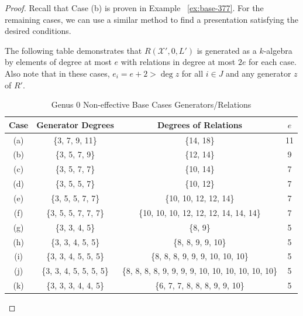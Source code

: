 \documentclass{amsart}
\theoremstyle{plain}
\theoremstyle{definition}
\theoremstyle{remark}
\numberwithin{equation}{section}
\newcommand \sx{\mathscr X}
\begin{document}
\begin{proof}
Recall that Case (b) is proven in Example ~\ref{ex:base-377}. For
the remaining cases, we can use a similar method to find a
presentation satisfying the desired conditions.

The following table demonstrates that $R(\sx', 0, L')$ is
generated as a $k$-algebra by elements of degree at most $e$
with relations in degree at most $2e$ for each case. Also note
that in these cases, $e_i = e + 2 > \deg z$ for all $i \in J$
and any generator $z$ of $R'$.
\begin{longtable}
	{| c || c | c | c |}
	\caption{Genus 0 Non-effective Base Cases Generators/Relations}
	\label{table:g-0-base-cases-degrees}
	
	\tabularnewline
	
	\hline
	Case & Generator Degrees & Degrees of Relations & $e$\\
	\hline
	\hline

	(a) & \{3, 7, 9, 11\} & \{14, 18\} & 11\\	\hline

	(b) & \{3, 5, 7, 9\} & \{12, 14\}	& 9\\ \hline

	(c) & \{3, 5, 7, 7\} & \{10, 14\}	& 7\\ \hline
	
	(d) & \{3, 5, 5, 7\} & \{10, 12\}	& 7\\ \hline
	
	(e) & \{3, 5, 5, 7, 7\} & \{10, 10, 12, 12, 14\}	& 7\\ \hline
	
	(f) & \{3, 5, 5, 7, 7, 7\} & \{10, 10, 10, 12, 12, 12, 14, 14, 14\}	& 7\\ \hline

	(g) & \{3, 3, 4, 5\} & \{8, 9\} & 5\\ \hline
	
	(h) & \{3, 3, 4, 5, 5\} & \{8, 8, 9, 9, 10\} & 5\\ \hline
	
	(i) & \{3, 3, 4, 5, 5, 5\} &
	\{8, 8, 8, 9, 9, 9, 10, 10, 10\} & 5\\ \hline
	
	(j) & \{3, 3, 4, 5, 5, 5, 5\} &
	\{8, 8, 8, 8, 9, 9, 9, 9, 10, 10, 10, 10, 10, 10\} & 5\\ \hline

	(k) &	\{3, 3, 3, 4,	4, 5\} & \{6, 7, 7, 8, 8, 8, 9, 9, 10\} & 5\\ \hline
\end{longtable}


\end{proof}
\end{document}
